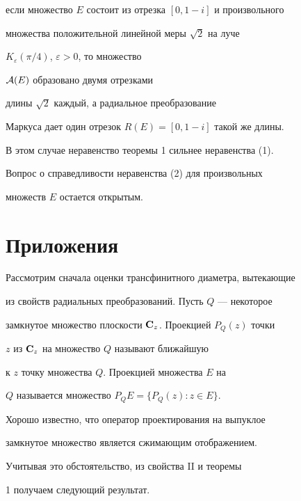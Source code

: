 если множество $E$ состоит из отрезка $[0, 1-i]$ и произвольного


множества положительной линейной меры $\sqrt{2}$ на луче


$K_{\varepsilon}(\pi /4)$, $\varepsilon >0$, то множество 


${\cal A} (E)$ образовано двумя отрезками


длины $\sqrt{2}$ каждый, а радиальное преобразование


Маркуса дает один отрезок $R(E)=[0,1-i]$  такой же длины.


В этом случае неравенство теоремы 1 сильнее неравенства (1).


Вопрос о справедливости неравенства (2) для произвольных


множеств $E$ остается открытым. 





\section{Приложения}


 


Рассмотрим сначала оценки трансфинитного диаметра, вытекающие 


из свойств радиальных преобразований. Пусть $Q$ --- некоторое 


замкнутое множество плоскости ${\bold C}_z$. Проекцией $P_Q(z)$ точки


$z$ из ${\bold C}_z$ на множество $Q$ называют ближайшую


к $z$ точку множества $Q$. Проекцией множества $E$ на


$Q$ называется множество $P_QE=\{ P_Q(z):z\in E\}$.


Хорошо известно, что оператор проектирования на выпуклое


замкнутое множество является сжимающим отображением.


Учитывая это обстоятельство, из свойства II и теоремы


1 получаем следующий результат.





